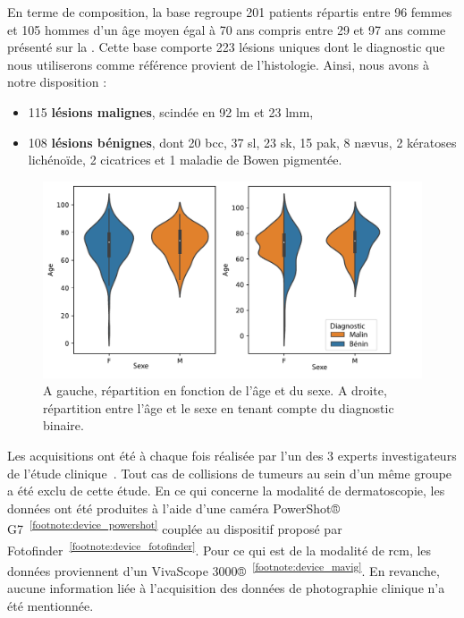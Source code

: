 En terme de composition, la base regroupe 201 patients répartis entre 96 femmes et 105 hommes d'un âge moyen égal à 70 ans compris entre 29 et 97 ans comme présenté sur la . Cette base comporte 223 lésions uniques dont le diagnostic que nous utiliserons comme référence provient de l'histologie. Ainsi, nous avons à notre disposition :
\begin{itemize}
    \item 115 \textbf{lésions malignes}, scindée en 92 \gls{lm} et 23 \gls{lmm},
    \item 108 \textbf{lésions bénignes}, dont 20 \gls{bcc}, 37 \gls{sl}, 23 \gls{sk}, 15 \gls{pak}, 8 nævus, 2 kératoses lichénoïde, 2 cicatrices et 1 maladie de Bowen pigmentée.
\end{itemize}\par

\begin{figure}[H]
    \centering
    \includegraphics[width=0.8\linewidth]{contents/chapter_3_1/resources/statistics_age_sex.pdf}
    \caption{A gauche, répartition en fonction de l'âge et du sexe. A droite, répartition entre l'âge et le sexe en tenant compte du diagnostic binaire.}
    \label{fig:statistics_age_sex}
\end{figure}\par

Les acquisitions ont été à chaque fois réalisée par l'un des 3 experts investigateurs de l'étude clinique~\cite{Cinotti2018}. Tout cas de collisions de tumeurs au sein d'un même groupe a été exclu de cette étude. En ce qui concerne la modalité de dermatoscopie, les données ont été produites à l'aide d'une caméra PowerShot® G7~\textsuperscript{\ref{footnote:device_powershot}} couplée au dispositif proposé par Fotofinder~\textsuperscript{\ref{footnote:device_fotofinder}}. Pour ce qui est de la modalité de \gls{rcm}, les données proviennent d'un VivaScope 3000®~\textsuperscript{\ref{footnote:device_mavig}}. En revanche, aucune information liée à l'acquisition des données de photographie clinique n'a été mentionnée.\par

